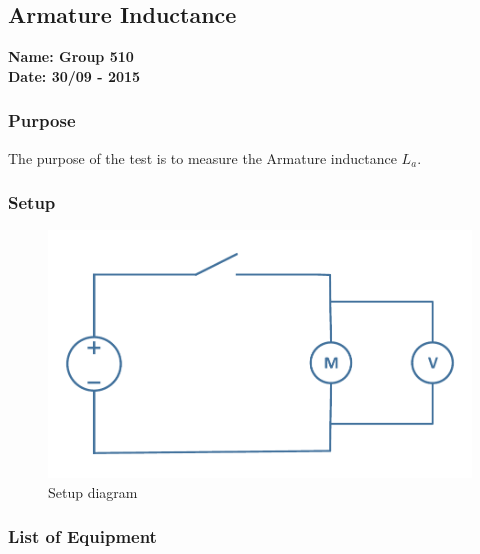 \pagebreak
\subsection{Armature Inductance}%
\textbf{Name: Group 510}\\
\textbf{Date: 30/09 - 2015}

\subsubsection{Purpose}
The purpose of the test is to measure the Armature inductance $L_a$.

\subsubsection{Setup}
\begin{figure}[H]
  \centering
	\includegraphics[scale=0.5]{figures/MotorTest2.pdf}
	\caption{Setup diagram}
\end{figure}

\subsubsection{List of Equipment}

